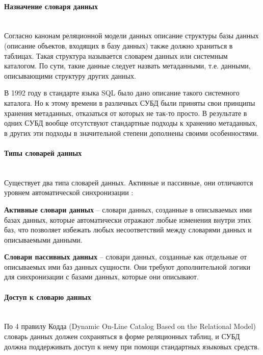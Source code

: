 \paragraph{Назначение словаря данных} ~\\

Согласно канонам реляционной модели данных описание структуры базы данных (описание объектов, входящих в базу данных) также должно храниться в таблицах. Такая структура называется словарем данных или системным каталогом. По сути, такие данные следует назвать метаданными, т.е. данными, описывающими структуру других данных.


В 1992 году в стандарте языка SQL было дано описание такого системного каталога. Но к этому времени в различных СУБД были приняты свои принципы хранения метаданных, отказаться от которых не так-то просто. В результате в одних СУБД вообще отсутствуют стандартные подходы к хранению метаданных, в других эти подходы в значительной степени дополнены своими особенностями. \autocite{Pirogov2009}

\paragraph{Типы словарей данных} ~\\

Существует два типа словарей данных. Активные и пассивные, они отличаются уровнем автоматической синхронизации \autocite{DataDictionary}:

\begin{grayquote}
    \textbf{Активные словари данных} -- словари данных, созданные в описываемых ими базах данных, которые автоматически отражают любые изменения внутри этих баз, что позволяет избежать любых несоответствий между словарями данных и описываемыми данными.
\end{grayquote}

\begin{grayquote}
    \textbf{Словари пассивных данных} -- словари данных, созданные как отдельные от описываемых ими баз данных сущности. Они требуют дополнительной логики для синхронизации с базами данных, которые они описывают.
\end{grayquote}

\paragraph{Доступ к словарю данных} ~\\

По 4 правилу Кодда (Dynamic On-Line Catalog Based on the Relational Model) словарь данных должен сохраняться в форме реляционных таблиц, и СУБД должна поддерживать доступ к нему при помощи стандартных языковых средств.


